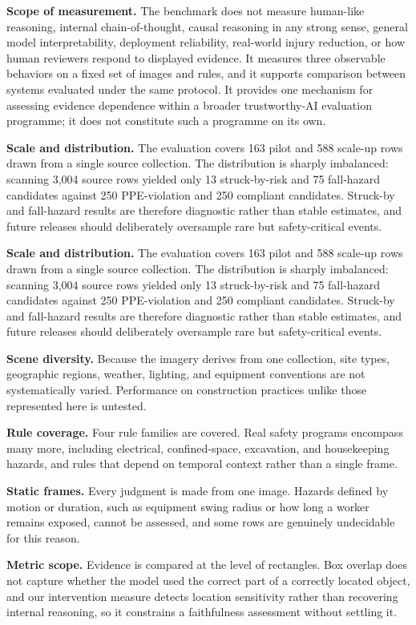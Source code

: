 \documentclass[conference]{IEEEtran}
\begin{document}
\textbf{Scope of measurement.} The benchmark does not measure human-like reasoning, internal chain-of-thought, causal reasoning in any strong sense, general model interpretability, deployment reliability, real-world injury reduction, or how human reviewers respond to displayed evidence. It measures three observable behaviors on a fixed set of images and rules, and it supports comparison between systems evaluated under the same protocol. It provides one mechanism for assessing evidence dependence within a broader trustworthy-AI evaluation programme; it does not constitute such a programme on its own.

\textbf{Scale and distribution.} The evaluation covers 163 pilot and 588 scale-up rows drawn from a single source collection. The distribution is sharply imbalanced: scanning 3,004 source rows yielded only 13 struck-by-risk and 75 fall-hazard candidates against 250 PPE-violation and 250 compliant candidates. Struck-by and fall-hazard results are therefore diagnostic rather than stable estimates, and future releases should deliberately oversample rare but safety-critical events.

\textbf{Scale and distribution.} The evaluation covers 163 pilot and 588 scale-up rows drawn from a single source collection. The distribution is sharply imbalanced: scanning 3,004 source rows yielded only 13 struck-by-risk and 75 fall-hazard candidates against 250 PPE-violation and 250 compliant candidates. Struck-by and fall-hazard results are therefore diagnostic rather than stable estimates, and future releases should deliberately oversample rare but safety-critical events.

\textbf{Scene diversity.} Because the imagery derives from one collection, site types, geographic regions, weather, lighting, and equipment conventions are not systematically varied. Performance on construction practices unlike those represented here is untested.

\textbf{Rule coverage.} Four rule families are covered. Real safety programs encompass many more, including electrical, confined-space, excavation, and housekeeping hazards, and rules that depend on temporal context rather than a single frame.

\textbf{Static frames.} Every judgment is made from one image. Hazards defined by motion or duration, such as equipment swing radius or how long a worker remains exposed, cannot be assessed, and some rows are genuinely undecidable for this reason.

\textbf{Metric scope.} Evidence is compared at the level of rectangles. Box overlap does not capture whether the model used the correct part of a correctly located object, and our intervention measure detects location sensitivity rather than recovering internal reasoning, so it constrains a faithfulness assessment without settling it.
\end{document}
